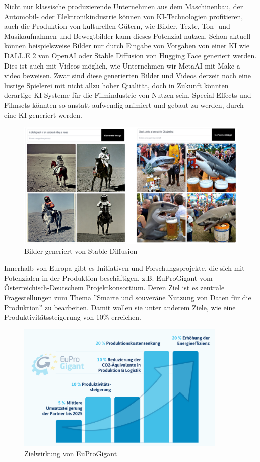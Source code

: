 \documentclass[a4paper,12pt, german]{report}
\begin{document}
Nicht nur klassische produzierende Unternehmen aus dem Maschinenbau, der Automobil- oder Elektronikindustrie können von KI-Technologien profitieren, auch die Produktion von kulturellen Gütern, wie Bilder, Texte, Ton- und Musikaufnahmen und Bewegtbilder kann dieses Potenzial nutzen. Schon aktuell können beispielsweise Bilder nur durch Eingabe von Vorgaben von einer KI wie DALL.E 2 von OpenAI oder Stable Diffusion von Hugging Face generiert werden. Dies ist auch mit Videos möglich, wie Unternehmen wir MetaAI mit Make-a-video beweisen. Zwar sind diese generierten Bilder und Videos derzeit noch eine lustige Spielerei mit nicht allzu hoher Qualität, doch in Zukunft könnten derartige KI-Systeme für die Filmindustrie von Nutzen sein. Special Effects und Filmsets könnten so anstatt aufwendig animiert und gebaut zu werden, durch eine KI generiert werden.

\begin{figure}[H]
  \center
 \includegraphics[width=14cm]{images/stableDif.png}
  \caption[Bilder generiert von Stable Diffusion]{Bilder generiert von Stable Diffusion \cite{38}}
\end{figure}

Innerhalb von Europa gibt es Initiativen und Forschungsprojekte, die sich mit Potenzialen in der Produktion beschäftigen, z.B. EuProGigant vom Österreichisch-Deutschem Projektkonsortium. Deren Ziel ist es zentrale Fragestellungen zum Thema ''Smarte und souveräne Nutzung von Daten für die Produktion'' zu bearbeiten. Damit wollen sie unter anderem Ziele, wie eine Produktivitätssteigerung von 10\% erreichen.\cite{39}
\begin{figure}[H]
  \center
 \includegraphics[width=10cm]{images/eupro.png}
  \caption[Zielwirkung von EuProGigant]{Zielwirkung von EuProGigant \cite{39}}
\end{figure}
\end{document}
